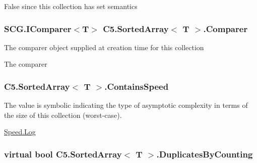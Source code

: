 False since this collection has set semantics\hypertarget{class_c5_1_1_sorted_array_a9ed85152fad0bbcbbc1213d1456a10b8}{}
\subsubsection[{Comparer}]{\setlength{\rightskip}{0pt plus 5cm}S\+C\+G.\+I\+Comparer$<$T$>$ {\bf C5.\+Sorted\+Array}$<$ T $>$.Comparer\hspace{0.3cm}{\ttfamily [get]}}\label{class_c5_1_1_sorted_array_a9ed85152fad0bbcbbc1213d1456a10b8}


The comparer object supplied at creation time for this collection 

The comparer\hypertarget{class_c5_1_1_sorted_array_abbd4d1c48fdb83cd02a18d6929401d55}{}
\subsubsection[{Contains\+Speed}]{ {\bf C5.\+Sorted\+Array}$<$ T $>$.Contains\+Speed\hspace{0.3cm}{\ttfamily [get]}}\label{class_c5_1_1_sorted_array_abbd4d1c48fdb83cd02a18d6929401d55}


The value is symbolic indicating the type of asymptotic complexity in terms of the size of this collection (worst-\/case). 

\hyperlink{namespace_c5_a615ba88dcdaa8d5a3c5f833a73d7fad6ace0be71e33226e4c1db2bcea5959f16b}{Speed.\+Log}\hypertarget{class_c5_1_1_sorted_array_a14c1830c13567153254f60c3719af675}{}
\subsubsection[{Duplicates\+By\+Counting}]{\setlength{\rightskip}{0pt plus 5cm}virtual bool {\bf C5.\+Sorted\+Array}$<$ T $>$.Duplicates\+By\+Counting\hspace{0.3cm}{\ttfamily [get]}}\label{class_c5_1_1_sorted_array_a14c1830c13567153254f60c3719af675}


